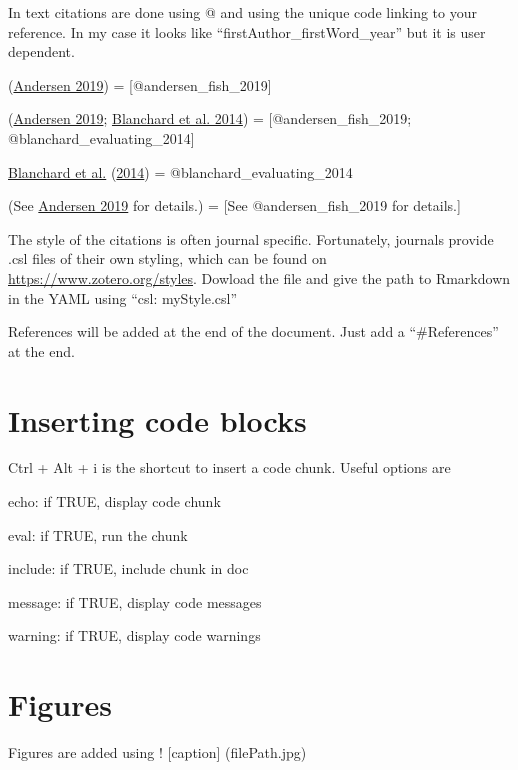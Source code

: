 \documentclass[
  11pt,
]{article}
\begin{document}
In text citations are done using @ and using the unique code linking to your reference. In my case it looks like ``firstAuthor\_firstWord\_year'' but it is user dependent.

(\protect\hyperlink{ref-andersen_fish_2019}{Andersen 2019}) = {[}@andersen\_fish\_2019{]}

(\protect\hyperlink{ref-andersen_fish_2019}{Andersen 2019}; \protect\hyperlink{ref-blanchard_evaluating_2014}{Blanchard et al. 2014}) = {[}@andersen\_fish\_2019; @blanchard\_evaluating\_2014{]}

\protect\hyperlink{ref-blanchard_evaluating_2014}{Blanchard et al.} (\protect\hyperlink{ref-blanchard_evaluating_2014}{2014}) = @blanchard\_evaluating\_2014

(See \protect\hyperlink{ref-andersen_fish_2019}{Andersen 2019} for details.) = {[}See @andersen\_fish\_2019 for details.{]}

The style of the citations is often journal specific. Fortunately, journals provide .csl files of their own styling, which can be found on \url{https://www.zotero.org/styles}. Dowload the file and give the path to Rmarkdown in the YAML using ``csl: myStyle.csl''

References will be added at the end of the document. Just add a ``\#References'' at the end.

\hypertarget{inserting-code-blocks}{%
\section{Inserting code blocks}\label{inserting-code-blocks}}

Ctrl + Alt + i is the shortcut to insert a code chunk. Useful options are

echo: if TRUE, display code chunk

eval: if TRUE, run the chunk

include: if TRUE, include chunk in doc

message: if TRUE, display code messages

warning: if TRUE, display code warnings

\hypertarget{figures}{%
\section{Figures}\label{figures}}

Figures are added using ! {[}caption{]} (filePath.jpg)
\end{document}
